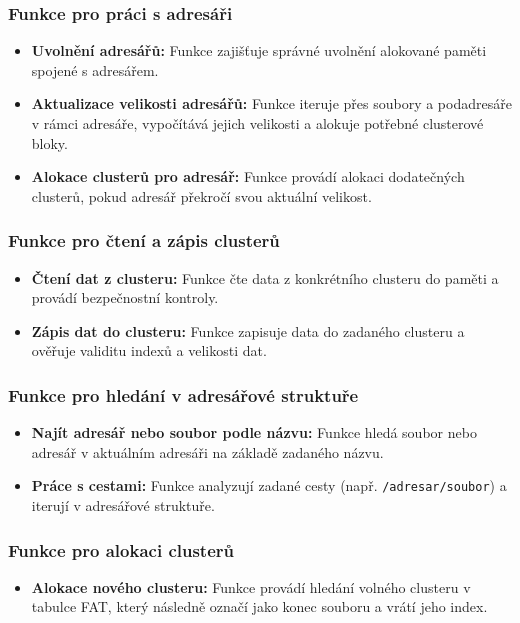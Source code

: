 \documentclass[12pt]{article}
\begin{document}
\subsubsection*{Funkce pro práci s adresáři}
\begin{itemize}
    \item \textbf{Uvolnění adresářů:} Funkce zajišťuje správné uvolnění alokované paměti spojené s adresářem.
    \item \textbf{Aktualizace velikosti adresářů:} Funkce iteruje přes soubory a podadresáře v rámci adresáře, vypočítává jejich velikosti a alokuje potřebné clusterové bloky.
    \item \textbf{Alokace clusterů pro adresář:} Funkce provádí alokaci dodatečných clusterů, pokud adresář překročí svou aktuální velikost.
\end{itemize}

\subsubsection*{Funkce pro čtení a zápis clusterů}
\begin{itemize}
    \item \textbf{Čtení dat z clusteru:} Funkce čte data z konkrétního clusteru do paměti a provádí bezpečnostní kontroly.
    \item \textbf{Zápis dat do clusteru:} Funkce zapisuje data do zadaného clusteru a ověřuje validitu indexů a velikosti dat.
\end{itemize}

\subsubsection*{Funkce pro hledání v adresářové struktuře}
\begin{itemize}
    \item \textbf{Najít adresář nebo soubor podle názvu:} Funkce hledá soubor nebo adresář v aktuálním adresáři na základě zadaného názvu.
    \item \textbf{Práce s cestami:} Funkce analyzují zadané cesty (např. \texttt{/adresar/soubor}) a iterují v adresářové struktuře.
\end{itemize}

\subsubsection*{Funkce pro alokaci clusterů}
\begin{itemize}
    \item \textbf{Alokace nového clusteru:} Funkce provádí hledání volného clusteru v tabulce FAT, který následně označí jako konec souboru a vrátí jeho index.
\end{itemize}
\end{document}
